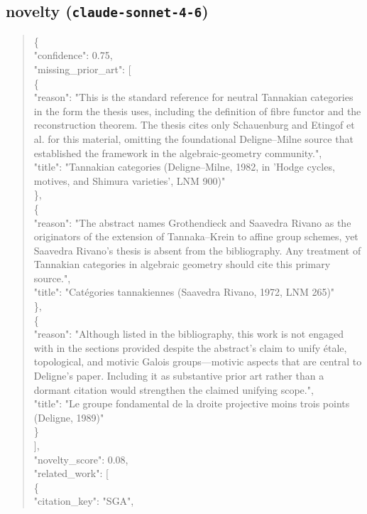 \documentclass[11pt]{article}
\begin{document}
\subsection*{novelty (\texttt{claude-sonnet-4-6})}
\begin{quote}\small\ttfamily\raggedright
\{\\
  "confidence": 0.75,\\
  "missing\_prior\_art": [\\
    \{\\
      "reason": "This is the standard reference for neutral Tannakian categories in the form the thesis uses, including the definition of fibre functor and the reconstruction theorem. The thesis cites only Schauenburg and Etingof et al. for this material, omitting the foundational Deligne--Milne source that established the framework in the algebraic-geometry community.",\\
      "title": "Tannakian categories (Deligne--Milne, 1982, in 'Hodge cycles, motives, and Shimura varieties', LNM 900)"\\
    \},\\
    \{\\
      "reason": "The abstract names Grothendieck and Saavedra Rivano as the originators of the extension of Tannaka--Krein to affine group schemes, yet Saavedra Rivano's thesis is absent from the bibliography. Any treatment of Tannakian categories in algebraic geometry should cite this primary source.",\\
      "title": "Catégories tannakiennes (Saavedra Rivano, 1972, LNM 265)"\\
    \},\\
    \{\\
      "reason": "Although listed in the bibliography, this work is not engaged with in the sections provided despite the abstract's claim to unify étale, topological, and motivic Galois groups---motivic aspects that are central to Deligne's paper. Including it as substantive prior art rather than a dormant citation would strengthen the claimed unifying scope.",\\
      "title": "Le groupe fondamental de la droite projective moins trois points (Deligne, 1989)"\\
    \}\\
  ],\\
  "novelty\_score": 0.08,\\
  "related\_work": [\\
    \{\\
      "citation\_key": "SGA",\\

\end{quote}
\end{document}
